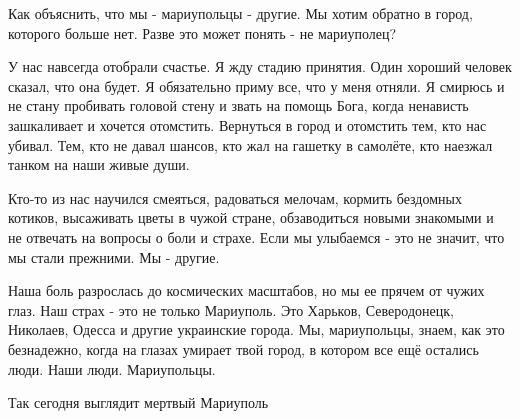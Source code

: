 Как объяснить, что мы - мариупольцы - другие. Мы хотим обратно в город,
которого больше нет. Разве это может понять - не мариуполец? 

У нас навсегда отобрали счастье. Я жду стадию принятия. Один хороший человек
сказал, что она будет. Я обязательно приму все, что у меня отняли. Я смирюсь и
не стану пробивать головой стену и звать на помощь Бога, когда ненависть
зашкаливает и хочется отомстить. Вернуться в город  и отомстить тем, кто нас
убивал. Тем, кто не давал шансов, кто жал на гашетку в самолёте, кто наезжал
танком на наши  живые души. 

Кто-то из нас  научился смеяться, радоваться мелочам, кормить бездомных
котиков, высаживать цветы в чужой стране, обзаводиться новыми  знакомыми и не
отвечать на вопросы о боли и страхе. Если мы улыбаемся - это не значит, что мы
стали прежними. Мы - другие.

Наша боль разрослась до космических масштабов, но мы ее прячем от чужих глаз.
Наш страх - это не только Мариуполь. Это Харьков, Северодонецк, Николаев,
Одесса и другие украинские города. Мы, мариупольцы, знаем, как это безнадежно,
когда на  глазах умирает твой город, в котором все ещё остались люди. Наши
люди. Мариупольцы. 

Так сегодня выглядит мертвый Мариуполь

